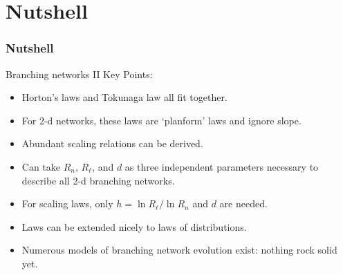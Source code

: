 \section{Nutshell}

\begin{frame}[label=]
  \frametitle{Nutshell}

  \begin{block}{Branching networks II Key Points:}
    \begin{itemize}
    \item<1->
      Horton's laws and Tokunaga law all fit together.
    \item<2->
      For 2-d networks, these laws are `planform' laws and ignore slope.
    \item<3->
      Abundant scaling relations can be derived.
    \item<4->
      Can take $R_n$, $R_\ell$, and $d$ as three independent parameters
      necessary to describe all 2-d branching networks.
    \item<5->
      For scaling laws, only $h = \ln R_\ell/ \ln R_n$ and $d$ are needed.
    \item<5->
      Laws can be extended nicely to laws of distributions.
    \item<6->
      Numerous models of branching network evolution exist: nothing rock solid yet.
    \end{itemize}
    
  \end{block}

\end{frame}



